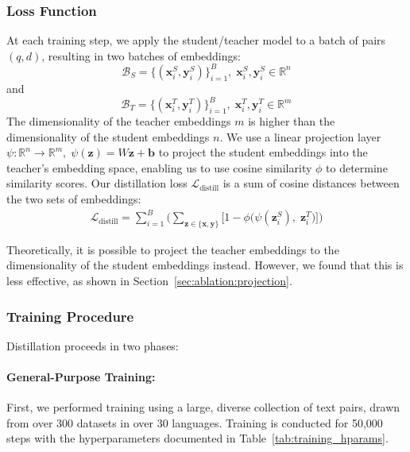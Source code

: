 \documentclass[11pt]{article}
\begin{document}
\subsubsection{Loss Function}
\label{sec:loss_func}

At each training step, we apply the student/teacher model to a batch of pairs $(q,d)$, resulting in two batches of embeddings:
\[
\mathcal{B}_S = \{ (\mathbf{x}^S_i, \mathbf{y}^S_i) \}_{i=1}^{B},\;\mathbf{x}^S_i, \mathbf{y}^S_i \in \mathbb{R}^n
\]
and
\[
\mathcal{B}_T = \{ (\mathbf{x}^T_i, \mathbf{y}^T_i) \}_{i=1}^{B},\;\mathbf{x}^T_i, \mathbf{y}^T_i \in \mathbb{R}^m
\]
%
The dimensionality of the teacher embeddings $m$ is higher than the dimensionality of the student embeddings $n$.
We use a linear projection layer $\psi : \mathbb{R}^n \to \mathbb{R}^m,\; \psi(\mathbf{z}) = W \mathbf{z} + \mathbf{b}$ to project the student embeddings into the teacher’s embedding space, enabling us to use cosine similarity $\phi$ to determine similarity scores.
Our distillation loss $\mathcal{L}_{\mathrm{distill}}$ is a sum of cosine distances between the two sets of embeddings:
\begin{align}
\label{eq:distill-loss}
\mathcal{L}_{\mathrm{distill}}
=
\sum_{i=1}^{B}
\Bigg(
\sum_{\mathbf{z} \in \{\mathbf{x},\mathbf{y}\}}
\bigl[1 - \phi\bigl(\psi(\mathbf{z}^S_i),\; \mathbf{z}^T_i\bigr)\bigr]
\Bigg)
\end{align}
%

%
Theoretically, it is possible to project the teacher embeddings to the dimensionality of the student embeddings instead. However, we found that this is less effective, as shown in Section~\ref{sec:ablation:projection}.

\subsubsection{Training Procedure}
Distillation proceeds in two phases:

\paragraph{General-Purpose Training:}
First, we performed training using a large, diverse collection of text pairs, drawn from over 300 datasets in over 30 languages.
Training is conducted for 50,000 steps with the hyperparameters documented in Table~\ref{tab:training_hparams}.
\end{document}
